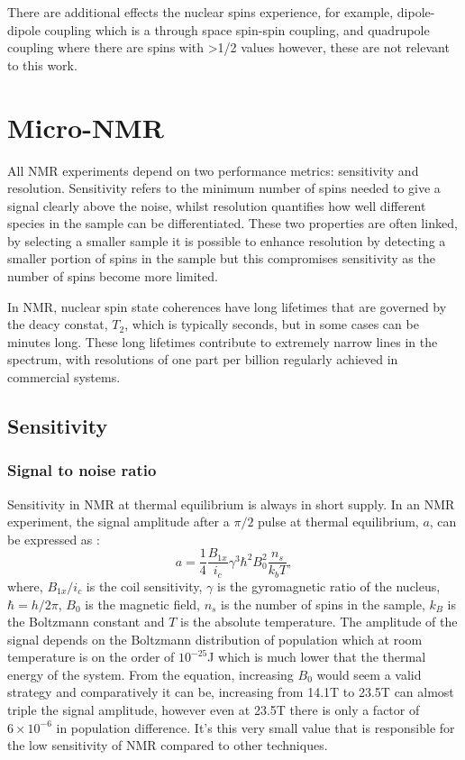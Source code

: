 There are additional effects the nuclear spins experience, for example, dipole-dipole coupling which
is a through space spin-spin coupling, and quadrupole coupling where there are spins with >1/2 values
however, these are not relevant to this work.

\newpage

\section{Micro-NMR}\label{Micro-NMR}

All NMR experiments depend on two performance metrics: sensitivity and resolution. Sensitivity
refers to the minimum number of spins needed to give a signal clearly above the noise, whilst resolution
quantifies how well different species in the sample can be differentiated. These two properties
are often linked, by selecting a smaller sample it is possible to enhance resolution by detecting
a smaller portion of spins in the sample but this compromises sensitivity as the number of spins become more limited.

 In NMR, nuclear spin state coherences have long lifetimes that are governed by the deacy constat, $T_2$, which is
 typically seconds, but in some cases can be minutes long. These long lifetimes contribute to extremely
 narrow lines in the spectrum, with resolutions of one part per billion regularly achieved in
 commercial systems.

 \subsection{Sensitivity}

 \subsubsection{Signal to noise ratio}


 Sensitivity in NMR at thermal equilibrium is always in short supply. In an NMR experiment, the signal amplitude after a $\pi/2$ pulse
 at thermal equilibrium, $a$, can be expressed as :
\begin{equation}
 a = \frac{1}{4}\frac{B_{1x}}{i_c}\gamma^3\hbar^2B_0^2\frac{n_s}{k_bT},
\end{equation}
where, $B_{1x}/i_c$ is the coil sensitivity, $\gamma$ is the gyromagnetic ratio of the nucleus,$\hbar = h/2\pi$, $B_0$ is the magnetic field, $n_s$ is
the number of spins in the sample, $k_B$ is the Boltzmann constant and $T$ is the absolute temperature. The amplitude
of the signal depends on the Boltzmann distribution of population which at room temperature is on the order of $10^{-25}$J
which is much lower that the thermal energy of the system. From the equation, increasing $B_0$ would seem a
valid strategy and comparatively it can be, increasing from 14.1T to 23.5T can almost triple the signal amplitude,
however even at 23.5T there is only a factor of ~$6\times10^{-6}$ in population difference. It's this
very small value that is responsible for the low sensitivity of NMR compared to other techniques.

